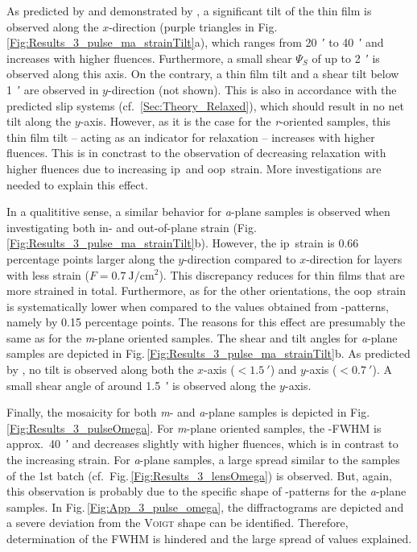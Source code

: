 As predicted by \textcite{grundmann2018} and demonstrated by \textcite{kneiss2021}, a significant tilt of the thin film is observed along the $x$-direction (purple triangles in Fig.\,\ref{Fig:Results_3_pulse_ma_strainTilt}a), which ranges from \qty{20}{\arcminute} to \qty{40}{\arcminute} and increases with higher fluences.
Furthermore, a small shear $\Psi_S$ of up to \qty{2}{\arcminute} is observed along this axis.
On the contrary, a thin film tilt and a shear tilt below \qty{1}{\arcminute} are observed in $y$-direction (not shown).
This is also in accordance with the predicted slip systems (cf.~\ref{Sec:Theory_Relaxed}), which should result in no net tilt along the $y$-axis.
However, as it is the case for the \textit{r}-oriented samples, this thin film tilt -- acting as an indicator for relaxation -- increases with higher fluences.
This is in conctrast to the observation of decreasing relaxation with higher fluences due to increasing \gls{ip}\ and \gls{oop}\ strain. 
More investigations are needed to explain this effect.

In a qualititive sense, a similar behavior for \textit{a}-plane samples is observed when investigating both in- and out-of-plane strain (Fig.\,\ref{Fig:Results_3_pulse_ma_strainTilt}b).
However, the \gls{ip}\ strain is 0.66 percentage points larger along the $y$-direction compared to $x$-direction for layers with less strain ($F=\qty{0.7}{\J\per\cm\squared}$).
This discrepancy reduces for thin films that are more strained in total.
Furthermore, as for the other orientations, the \gls{oop}\ strain is systematically lower when compared to the values obtained from \thetaomega-patterns, namely by 0.15 percentage points.
The reasons for this effect are presumably the same as for the \textit{m}-plane oriented samples.
The shear and tilt angles for \textit{a}-plane samples are depicted in Fig.\,\ref{Fig:Results_3_pulse_ma_strainTilt}b.
As predicted by \textcite{grundmann2018}, no tilt is observed along both the $x$-axis ($<\qty{1.5}{\arcminute}$) and $y$-axis ($<\qty{0.7}{\arcminute}$).
A small shear angle of around \qty{1.5}{\arcminute} is observed along the $y$-axis.

Finally, the mosaicity for both \textit{m}- and \textit{a}-plane samples is depicted in Fig.\,\ref{Fig:Results_3_pulseOmega}.
For \textit{m}-plane oriented samples, the \textomega-FWHM is approx.\ \qty{40}{\arcminute} and decreases slightly with higher fluences, which is in contrast to the increasing strain.
For \textit{a}-plane samples, a large spread similar to the samples of the 1st batch (cf.\ Fig.\,\ref{Fig:Results_3_lensOmega}) is observed.
But, again, this observation is probably due to the specific shape of \textomega-patterns for the \textit{a}-plane samples.
In Fig.\,\ref{Fig:App_3_pulse_omega}, the diffractograms are depicted and a severe deviation from the \textsc{Voigt} shape can be identified.
Therefore, determination of the \gls{FWHM} is hindered and the large spread of values explained.

